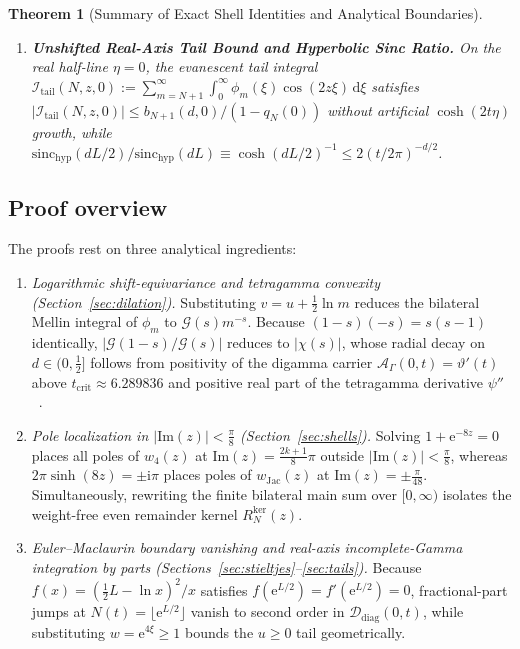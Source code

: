 \documentclass[11pt,reqno]{amsart}
\newtheorem{theorem}{Theorem}[section]
\theoremstyle{definition}
\theoremstyle{remark}
\numberwithin{equation}{section}
\newcommand{\dd}{\mathrm{d}}
\newcommand{\ii}{\mathrm{i}}
\newcommand{\ee}{\mathrm{e}}
\newcommand{\Ima}{\mathrm{Im}}
\newcommand{\sinchyp}{\mathrm{sinc}_{\mathrm{hyp}}}
\begin{document}
\begin{theorem}[Summary of Exact Shell Identities and Analytical Boundaries]
\begin{enumerate}[label=\textup{(\roman*)},leftmargin=2.2em]
\item \textbf{Unshifted Real-Axis Tail Bound and Hyperbolic Sinc Ratio.} On the real half-line $\eta = 0$, the evanescent tail integral $\mathcal{I}_{\mathrm{tail}}(N,z,0) := \sum_{m=N+1}^{\infty} \int_0^{\infty} \phi_m(\xi)\allowbreak\cos(2z\xi)\,\dd\xi$ satisfies $\lvert\mathcal{I}_{\mathrm{tail}}(N,z,0)\rvert \le b_{N+1}(d,0)/(1 - q_N(0))$ without artificial $\cosh(2t\eta)$ growth, while $\sinchyp(dL/2)/\sinchyp(dL) \equiv \cosh(dL/2)^{-1} \le 2(t/2\pi)^{-d/2}$.
\end{enumerate}
\end{theorem}

\subsection{Proof overview}\label{subsec:proof_overview}

The proofs rest on three analytical ingredients:
\begin{enumerate}[label=\textup{(\arabic*)},leftmargin=2.2em]
\item \textit{Logarithmic shift-equivariance and tetragamma convexity (Section~\ref{sec:dilation}).} Substituting $v = u + \frac{1}{2}\ln m$ reduces the bilateral Mellin integral of $\phi_m$ to $\mathcal{G}(s)m^{-s}$. Because $(1-s)(-s) = s(s-1)$ identically, $\lvert\mathcal{G}(1-s)/\mathcal{G}(s)\rvert$ reduces to $\lvert\chi(s)\rvert$, whose radial decay on $d \in (0, \frac{1}{2}]$ follows from positivity of the digamma carrier $\mathcal{A}_\Gamma(0,t) = \vartheta'(t)$ above $t_{\mathrm{crit}} \approx 6.289836$ and positive real part of the tetragamma derivative $\psi''$~\cite{olver1997,spira1965,saidakzvengrowski2003}.
\item \textit{Pole localization in $\lvert\Ima(z)\rvert < \frac{\pi}{8}$ (Section~\ref{sec:shells}).} Solving $1 + \ee^{-8z} = 0$ places all poles of $w_4(z)$ at $\Ima(z) = \frac{2k+1}{8}\pi$ outside $\lvert\Ima(z)\rvert < \frac{\pi}{8}$, whereas $2\pi\sinh(8z) = \pm\ii\pi$ places poles of $w_{\mathrm{Jac}}(z)$ at $\Ima(z) = \pm\frac{\pi}{48}$. Simultaneously, rewriting the finite bilateral main sum over $[0, \infty)$ isolates the weight-free even remainder kernel $R_N^{\mathrm{ker}}(z)$.
\item \textit{Euler--Maclaurin boundary vanishing and real-axis incomplete-Gamma integration by parts (Sections~\ref{sec:stieltjes}--\ref{sec:tails}).} Because $f(x) = (\frac{1}{2}L - \ln x)^2/x$ satisfies $f(\ee^{L/2}) = f'(\ee^{L/2}) = 0$, fractional-part jumps at $N(t) = \lfloor\ee^{L/2}\rfloor$ vanish to second order in $\mathcal{D}_{\mathrm{diag}}(0,t)$, while substituting $w = \ee^{4\xi} \ge 1$ bounds the $u \ge 0$ tail geometrically.
\end{enumerate}
\end{document}
